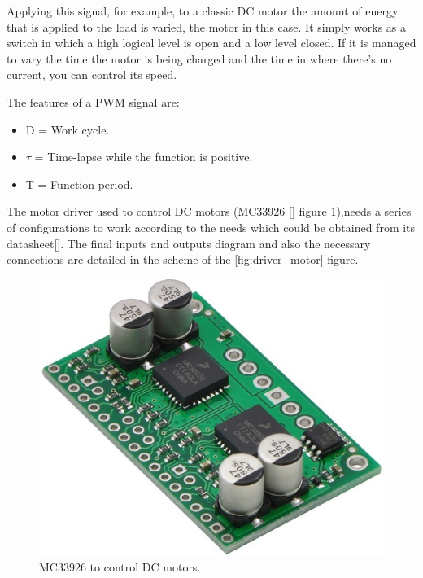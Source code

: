 Applying this signal, for example, to a classic DC motor the amount of energy that is applied to the load is varied, the motor in this case. It simply works as a switch in which a high logical level is open and a low level closed. If it is managed to vary the time the motor is being charged and the time in where there’s no current, you can control its speed. \newline

The features of a PWM signal are: 
\begin{itemize}
	\item D = Work cycle.
	\item $\tau$ = Time-lapse while the function is positive.
	\item T = Function period.
\end{itemize}


The motor driver used to control DC motors (MC33926 [] figure \ref{fig:driver_motor_fisico}),needs a series of configurations to work according to the needs which could be obtained from its datasheet[]. The final inputs and outputs diagram and also the necessary connections are detailed in the scheme of the \ref{fig:driver_motor} figure.


\begin{figure}[H]
	\center
	\includegraphics[trim = 0mm 0cm 0mm 0cm, clip,scale=0.4]{imagenes/Balancing_robot/driver_motor.jpg}
	\caption{MC33926 to control DC motors.}
	\label{fig:driver_motor_fisico}
\end{figure}


